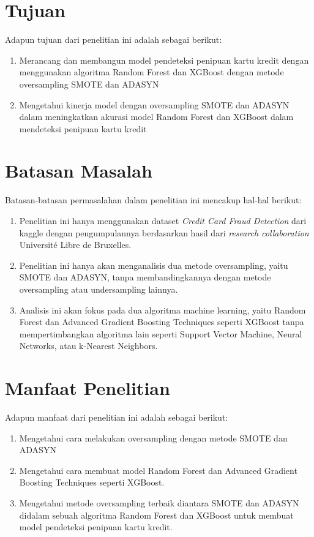 \section{Tujuan} \label{I.Tujuan}
Adapun tujuan dari penelitian ini adalah sebagai berikut:
\begin{enumerate}[noitemsep]
        \item Merancang dan membangun model pendeteksi penipuan kartu kredit dengan menggunakan algoritma Random Forest dan XGBoost dengan metode oversampling SMOTE dan ADASYN
        \item Mengetahui kinerja model dengan oversampling SMOTE dan ADASYN dalam meningkatkan akurasi model Random Forest dan XGBoost dalam mendeteksi penipuan kartu kredit
\end{enumerate}

\section{Batasan Masalah} \label{I.Batasan}
Batasan-batasan permasalahan dalam penelitian ini mencakup hal-hal berikut: 
\begin{enumerate}[noitemsep]
    \item Penelitian ini hanya menggunakan  dataset \textit{Credit Card Fraud Detection} dari kaggle dengan pengumpulannya berdasarkan hasil dari \textit{research collaboration} Université Libre de Bruxelles.
    \item Penelitian ini hanya akan menganalisis dua metode oversampling, yaitu SMOTE dan ADASYN, tanpa membandingkannya dengan metode oversampling atau undersampling lainnya.
    \item Analisis ini akan fokus pada dua algoritma machine learning, yaitu Random Forest dan Advanced Gradient Boosting Techniques seperti XGBoost tanpa mempertimbangkan algoritma lain seperti Support Vector Machine, Neural Networks, atau k-Nearest Neighbors.
\end{enumerate}

\section{Manfaat Penelitian} \label{I.Manfaat}
Adapun manfaat dari penelitian ini adalah sebagai berikut:
\begin{enumerate}[noitemsep]
    \item Mengetahui cara melakukan oversampling dengan metode SMOTE dan ADASYN
    \item Mengetahui cara membuat model Random Forest dan Advanced Gradient Boosting Techniques seperti XGBoost.
    \item Mengetahui metode oversampling terbaik diantara SMOTE dan ADASYN didalam sebuah algoritma Random Forest dan XGBoost untuk membuat model pendeteksi penipuan kartu kredit.
\end{enumerate}

